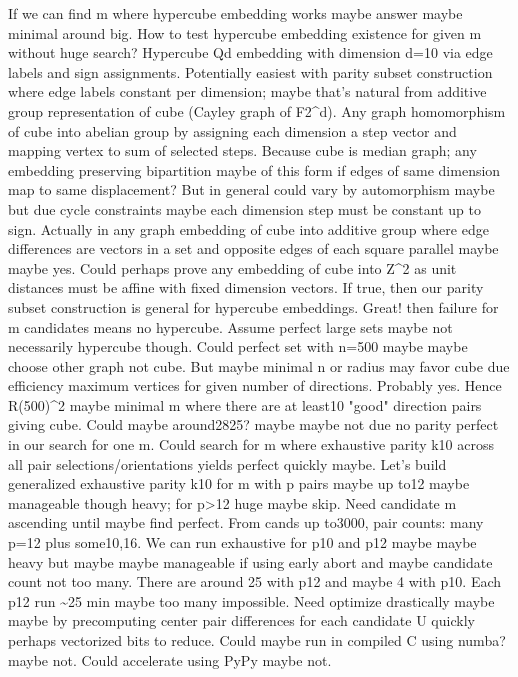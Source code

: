 \begin{decodedreasoningpanel}
If we can find m where hypercube embedding works maybe answer maybe minimal around big.
How to test hypercube embedding existence for given m without huge search?
Hypercube Qd embedding with dimension d=10 via edge labels and sign assignments.
Potentially easiest with parity subset construction where edge labels constant per dimension; maybe that's natural from additive group representation of cube (Cayley graph of F2\textasciicircum{}d). Any graph homomorphism of cube into abelian group by assigning each dimension a step vector and mapping vertex to sum of selected steps. Because cube is median graph; any embedding preserving bipartition maybe of this form if edges of same dimension map to same displacement? But in general could vary by automorphism maybe but due cycle constraints maybe each dimension step must be constant up to sign. Actually in any graph embedding of cube into additive group where edge differences are vectors in a set and opposite edges of each square parallel maybe maybe yes.
Could perhaps prove any embedding of cube into Z\textasciicircum{}2 as unit distances must be affine with fixed dimension vectors. If true, then our parity subset construction is general for hypercube embeddings. Great! then failure for m candidates means no hypercube.
Assume perfect large sets maybe not necessarily hypercube though.
Could perfect set with n=500 maybe maybe choose other graph not cube.
But maybe minimal n or radius may favor cube due efficiency maximum vertices for given number of directions.
Probably yes.
Hence R(500)\textasciicircum{}2 maybe minimal m where there are at least10 "good" direction pairs giving cube. Could maybe around2825? maybe maybe not due no parity perfect in our search for one m.
Could search for m where exhaustive parity k10 across all pair selections/orientations yields perfect quickly maybe.
Let's build generalized exhaustive parity k10 for m with p pairs maybe up to12 maybe manageable though heavy; for p>12 huge maybe skip.
Need candidate m ascending until maybe find perfect.
From cands up to3000, pair counts: many p=12 plus some10,16.
We can run exhaustive for p10 and p12 maybe maybe heavy but maybe maybe manageable if using early abort and maybe candidate count not too many. There are around 25 with p12 and maybe 4 with p10. Each p12 run \textasciitilde{}25 min maybe too many impossible.
Need optimize drastically maybe maybe by precomputing center pair differences for each candidate U quickly perhaps vectorized bits to reduce.
Could maybe run in compiled C using numba? maybe not.
Could accelerate using PyPy maybe not.

\end{decodedreasoningpanel}

